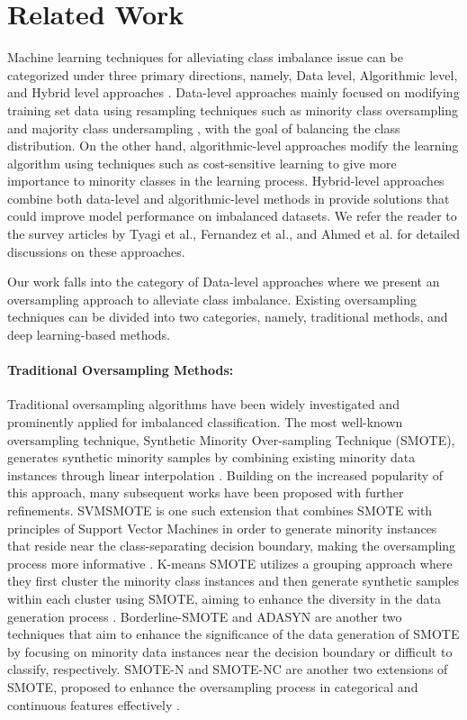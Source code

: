 \section{Related Work}
\label{sec:related}

Machine learning techniques for alleviating class imbalance issue can be categorized under three primary directions, namely, Data level, Algorithmic level, and Hybrid level approaches \cite{sharma2022review,sowah2021hcbst}. Data-level approaches mainly focused on modifying training set data using resampling techniques such as minority class oversampling \cite{gosain2017handling} and majority class undersampling \cite{devi2020review}, with the goal of balancing the class distribution. On the other hand, algorithmic-level approaches modify the learning algorithm using techniques such as cost-sensitive learning \cite{ling2008cost} to give more importance to minority classes in the learning process. Hybrid-level approaches combine both data-level and algorithmic-level methods in provide solutions that could improve model performance on imbalanced datasets. We refer the reader to the survey articles by Tyagi et al.\cite{tyagi2020sampling}, Fernandez et al.\cite{fernandez2018algorithm}, and Ahmed et al.\cite{ahmed2023comparative} for detailed discussions on these approaches.

Our work falls into the category of Data-level approaches where we present an oversampling approach to alleviate class imbalance. Existing oversampling techniques can be divided into two categories, namely, traditional methods, and deep learning-based methods.

\paragraph{\textbf{Traditional Oversampling Methods: }} Traditional oversampling algorithms have been widely investigated and prominently applied for imbalanced classification. The most well-known oversampling technique, Synthetic Minority Over-sampling Technique (SMOTE), generates synthetic minority samples by combining existing minority data instances through linear interpolation \cite{chawla2002smote}. Building on the increased popularity of this approach, many subsequent works have been proposed with further refinements. SVMSMOTE is one such extension that combines SMOTE with principles of Support Vector Machines in order to generate minority instances that reside near the class-separating decision boundary, making the oversampling process more informative \cite{tang2008svms}. K-means SMOTE utilizes a grouping approach where they first cluster the minority class instances and then generate synthetic samples within each cluster using SMOTE, aiming to enhance the diversity in the data generation process \cite{last2017kmeanssmote}. Borderline-SMOTE \cite{han2005borderline} and ADASYN \cite{he2008adasyn} are another two techniques that aim to enhance the significance of the data generation of SMOTE by focusing on minority data instances near the decision boundary or difficult to classify, respectively. SMOTE-N and SMOTE-NC are another two extensions of SMOTE, proposed to enhance the oversampling process in categorical and continuous features effectively \cite{chawla2002smote}.

